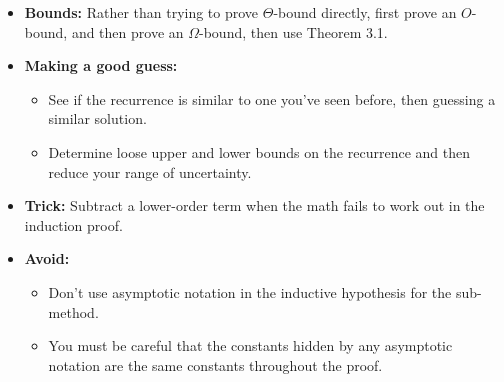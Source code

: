     \begin{intuition}
        \begin{itemize}
            \item \textbf{Bounds:} Rather than trying to prove $\Theta$-bound directly, first prove an $O$-bound, and then prove an $\Omega$-bound, then use Theorem 3.1.
            \item \textbf{Making a good guess:}
            \begin{itemize}
                \item See if the recurrence is similar to one you've seen before, then guessing a similar solution.
                \item Determine loose upper and lower bounds on the recurrence and then reduce your range of uncertainty.
            \end{itemize}
            \item \textbf{Trick:} Subtract a lower-order term when the math fails to work out in the induction proof.
            \item \textbf{Avoid:} 
            \begin{itemize}
                \item Don't use asymptotic notation in the inductive hypothesis for the sub-method.
                \item You must be careful that the constants hidden by any asymptotic notation are the same constants throughout the proof.
            \end{itemize}
        \end{itemize}
    \end{intuition}


